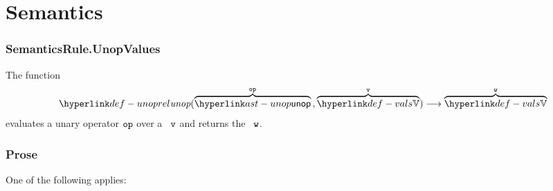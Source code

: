 \section{Semantics}

\subsubsection{SemanticsRule.UnopValues \label{sec:SemanticsRule.UnopValues}}
\hypertarget{def-unoprel}{}
The function
\[
  \unoprel(\overname{\unop}{\op} \aslsep \overname{\vals}{\vv}) \aslto \overname{\vals}{\vw}
\]
evaluates a unary operator $\texttt{op}$ over a \nativevalue\  $\texttt{v}$ and returns the \nativevalue\  $\texttt{w}$.

\subsubsection{Prose}
One of the following applies:
